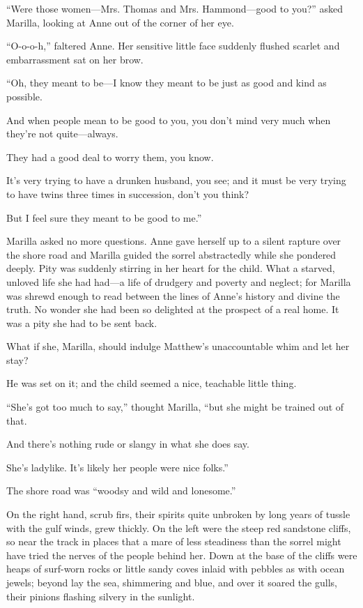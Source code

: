 \documentclass[a4paper]{article}
\begin{document}
\tiny{``Were those women---Mrs. Thomas and Mrs. Hammond---good to you?'' asked Marilla, looking at Anne out of the corner of her eye.

\scriptsize{``O-o-o-h,'' faltered Anne. Her sensitive little face suddenly flushed scarlet and embarrassment sat on her brow. \footnotesize{``Oh, they meant to be---I know they meant to be just as good and kind as possible. \small{And when people mean to be good to you, you don't mind very much when they're not quite---always. \normalsize{They had a good deal to worry them, you know. \large{It's very trying to have a drunken husband, you see; and it must be very trying to have twins three times in succession, don't you think? \Large{But I feel sure they meant to be good to me.''

\LARGE{Marilla asked no more questions. \huge{Anne gave herself up to a silent rapture over the shore road and Marilla guided the sorrel abstractedly while she pondered deeply. \Huge{Pity was suddenly stirring in her heart for the child.} What a starved, unloved life she had had---a life of drudgery and poverty and neglect; for Marilla was shrewd enough to read between the lines of Anne's history and divine the truth.} No wonder she had been so delighted at the prospect of a real home.} It was a pity she had to be sent back.} What if she, Marilla, should indulge Matthew's unaccountable whim and let her stay?} He was set on it; and the child seemed a nice, teachable little thing.}

``She's got too much to say,'' thought Marilla, ``but she might be trained out of that.} And there's nothing rude or slangy in what she does say.} She's ladylike. It's likely her people were nice folks.''}

The shore road was ``woodsy and wild and lonesome.''} On the right hand, scrub firs, their spirits quite unbroken by long years of tussle with the gulf winds, grew thickly. On the left were the steep red sandstone cliffs, so near the track in places that a mare of less steadiness than the sorrel might have tried the nerves of the people behind her. Down at the base of the cliffs were heaps of surf-worn rocks or little sandy coves inlaid with pebbles as with ocean jewels; beyond lay the sea, shimmering and blue, and over it soared the gulls, their pinions flashing silvery in the sunlight.
\end{document}
